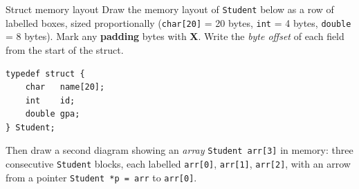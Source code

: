 \documentclass[11pt]{article}
\begin{document}
\begin{drawex}{Struct memory layout}
Draw the memory layout of \texttt{Student} below as a row of labelled boxes,
sized proportionally (\texttt{char[20]} = 20 bytes, \texttt{int} = 4 bytes,
\texttt{double} = 8 bytes). Mark any \textbf{padding} bytes with \textbf{X}.
Write the \emph{byte offset} of each field from the start of the struct.
\begin{lstlisting}
typedef struct {
    char   name[20];
    int    id;
    double gpa;
} Student;
\end{lstlisting}
Then draw a second diagram showing an \emph{array} \texttt{Student arr[3]}
in memory: three consecutive \texttt{Student} blocks, each labelled
\texttt{arr[0]}, \texttt{arr[1]}, \texttt{arr[2]}, with an arrow from a pointer
\texttt{Student *p = arr} to \texttt{arr[0]}.
\end{drawex}
\end{document}
